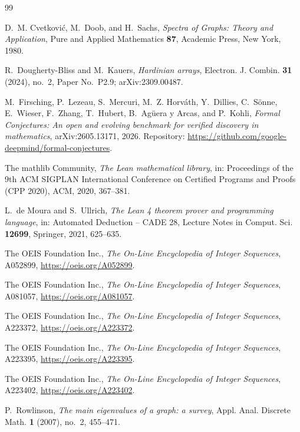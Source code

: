 \documentclass[11pt]{amsart}
\theoremstyle{plain}
\theoremstyle{definition}
\begin{document}
{\footnotesize
\begin{thebibliography}{99}

D.~M. Cvetkovi\'c, M.~Doob, and H.~Sachs, \emph{Spectra of Graphs: Theory and Application}, Pure and Applied Mathematics \textbf{87}, Academic Press, New York, 1980.

R.~Dougherty-Bliss and M.~Kauers, \emph{Hardinian arrays}, Electron. J. Combin. \textbf{31} (2024), no.~2, Paper No.~P2.9; arXiv:2309.00487.

M.~Firsching, P.~Lezeau, S.~Mercuri, M.~Z. Horv\'ath, Y.~Dillies, C.~S\"onne, E.~Wieser, F.~Zhang, T.~Hubert, B.~Ag\"uera y Arcas, and P.~Kohli, \emph{Formal Conjectures: An open and evolving benchmark for verified discovery in mathematics}, arXiv:2605.13171, 2026. Repository: \url{https://github.com/google-deepmind/formal-conjectures}.

The mathlib Community, \emph{The Lean mathematical library}, in: Proceedings of the 9th ACM SIGPLAN International Conference on Certified Programs and Proofs (CPP 2020), ACM, 2020, 367--381.

L.~de Moura and S.~Ullrich, \emph{The Lean 4 theorem prover and programming language}, in: Automated Deduction -- CADE 28, Lecture Notes in Comput. Sci. \textbf{12699}, Springer, 2021, 625--635.

The OEIS Foundation Inc., \emph{The On-Line Encyclopedia of Integer Sequences}, A052899, \url{https://oeis.org/A052899}.

The OEIS Foundation Inc., \emph{The On-Line Encyclopedia of Integer Sequences}, A081057, \url{https://oeis.org/A081057}.

The OEIS Foundation Inc., \emph{The On-Line Encyclopedia of Integer Sequences}, A223372, \url{https://oeis.org/A223372}.

The OEIS Foundation Inc., \emph{The On-Line Encyclopedia of Integer Sequences}, A223395, \url{https://oeis.org/A223395}.

The OEIS Foundation Inc., \emph{The On-Line Encyclopedia of Integer Sequences}, A223402, \url{https://oeis.org/A223402}.

P.~Rowlinson, \emph{The main eigenvalues of a graph: a survey}, Appl. Anal. Discrete Math. \textbf{1} (2007), no.~2, 455--471.

\end{thebibliography}
}
\end{document}
